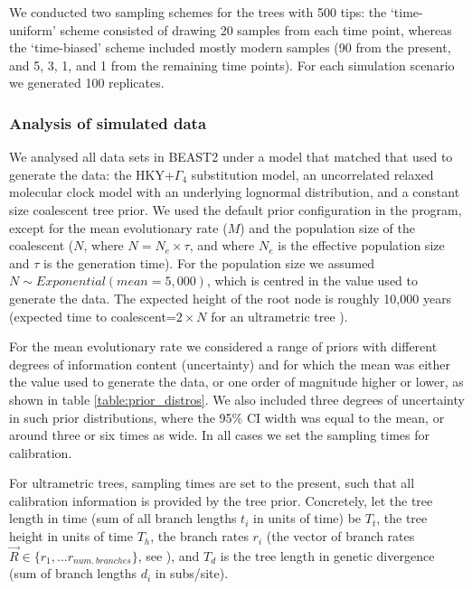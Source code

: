 \documentclass[11pt]{article}
\begin{document}
We conducted two sampling schemes for the trees with 500 tips: the `time-uniform' scheme consisted of drawing 20 samples from each time point, whereas the `time-biased' scheme included mostly modern samples (90 from the present, and 5, 3, 1, and 1 from the remaining time points). For each simulation scenario we generated 100 replicates.

\subsubsection{Analysis of simulated data}
We analysed all data sets in BEAST2 under a model that matched that used to generate the data: the HKY+$\Gamma_4$ substitution model, an uncorrelated relaxed molecular clock model with an underlying lognormal distribution, and a constant size coalescent tree prior. We used the default prior configuration in the program, except for the mean evolutionary rate ($M$) and the population size of the coalescent ($N$, where $N=N_e\times \tau$, and where $N_e$ is the effective population size and $\tau$ is the generation time). For the population size we assumed $ N \sim Exponential(mean=5,000)$, which is centred in the value used to generate the data. The expected height of the root node is roughly 10,000 years (expected time to coalescent=$2\times N$ for an ultrametric tree \citep{nordborg2019coalescent, arbisser2018joint}). 

For the mean evolutionary rate we considered a range of priors with different degrees of information content (uncertainty) and for which the mean was either the value used to generate the data, or one order of magnitude higher or lower, as shown in table \ref{table:prior_distros}. We also included three degrees of uncertainty in such prior distributions, where the 95\% CI width was equal to the mean, or around three or six times as wide. In all cases we set the sampling times for calibration. 

For ultrametric trees, sampling times are set to the present, such that all calibration information is provided by the tree prior. Concretely, let the tree length in time (sum of all branch lengths $t_i$ in units of time) be $T_t$, the tree height in units of time $T_h$, the branch rates $r_i$ (the vector of branch rates $\vec{R}\in \{r_1,...r_{num.\ branches}\}$, see \citealt{douglas2021adaptive}), and $T_d$ is the tree length in genetic divergence (sum of branch lengths $d_i$ in subs/site).
\end{document}
